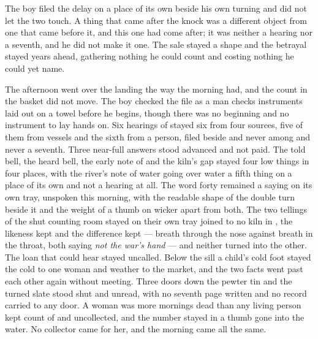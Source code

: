 The boy filed the delay on a place of its own beside his own turning and did not let the two touch. A thing that came after the knock was a different object from one that came before it, and this one had come after; it was neither a hearing nor a seventh, and he did not make it one. The sale stayed a shape and the betrayal stayed years ahead, gathering nothing he could count and costing nothing he could yet name.

\scenebreak

The afternoon went over the landing the way the morning had, and the count in the basket did not move. The boy checked the file as a man checks instruments laid out on a towel before he begins, though there was no beginning and no instrument to lay hands on. Six hearings of  stayed six from four sources, five of them from vessels and the sixth from a person, filed beside and never among and never a seventh. Three near-full answers stood advanced and not paid. The told bell, the heard bell, the early note of  and the kiln's gap stayed four low things in four places, with the river's note of water going over water a fifth thing on a place of its own and not a hearing at all. The word forty remained a saying on its own tray, unspoken this morning, with the readable shape of the double turn beside it and the weight of a thumb on wicker apart from both. The two tellings of the shut counting room stayed on their own tray joined to no kiln in , the likeness kept and the difference kept --- breath through the nose against breath in the throat, both saying \emph{not the war's hand} --- and neither turned into the other. The loan that could hear stayed uncalled. Below the sill a child's cold foot stayed the cold to one woman and weather to the market, and the two facts went past each other again without meeting. Three doors down the pewter tin and the turned slate stood shut and unread, with no seventh page written and no record carried to any door. A woman was more mornings dead than any living person kept count of and uncollected, and the number stayed in a thumb gone into the water. No collector came for her, and the morning came all the same.

